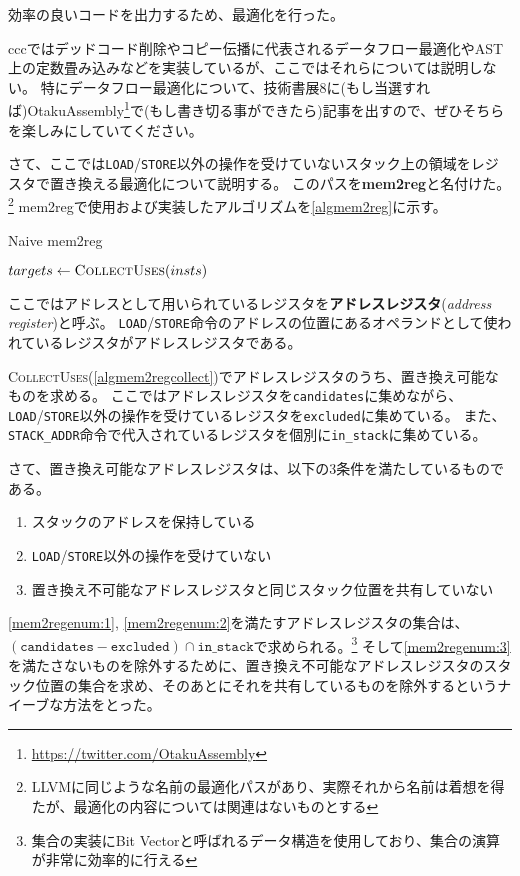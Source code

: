 \documentclass[../main.tex]{subfiles}
\begin{document}
効率の良いコードを出力するため、最適化を行った。

cccではデッドコード削除やコピー伝播に代表されるデータフロー最適化やAST上の定数畳み込みなどを実装しているが、ここではそれらについては説明しない。
特にデータフロー最適化について、技術書展8に(もし当選すれば)OtakuAssembly\footnote{\url{https://twitter.com/OtakuAssembly}}で(もし書き切る事ができたら)記事を出すので、ぜひそちらを楽しみにしていてください。

さて、ここでは\texttt{LOAD}/\texttt{STORE}以外の操作を受けていないスタック上の領域をレジスタで置き換える最適化について説明する。
このパスを\textbf{mem2reg}と名付けた。\footnote{LLVMに同じような名前の最適化パスがあり、実際それから名前は着想を得たが、最適化の内容については関連はないものとする}
mem2regで使用および実装したアルゴリズムを\cref{algmem2reg}に示す。

\begin{algorithm}[h]
\caption{Naive mem2reg}\label{algmem2reg}
\begin{algorithmic}[1]
  \State $targets \gets \Call{CollectUses}{insts}$
  \State {}
\EndProcedure
\end{algorithmic}
\end{algorithm}

ここではアドレスとして用いられているレジスタを\textbf{アドレスレジスタ}(\textit{address register})と呼ぶ。
\texttt{LOAD}/\texttt{STORE}命令のアドレスの位置にあるオペランドとして使われているレジスタがアドレスレジスタである。

\textsc{CollectUses}(\cref{algmem2regcollect})でアドレスレジスタのうち、置き換え可能なものを求める。
ここではアドレスレジスタを\texttt{candidates}に集めながら、\texttt{LOAD}/\texttt{STORE}以外の操作を受けているレジスタを\texttt{excluded}に集めている。
また、\texttt{STACK\_ADDR}命令で代入されているレジスタを個別に\texttt{in\_stack}に集めている。

さて、置き換え可能なアドレスレジスタは、以下の3条件を満たしているものである。
\begin{enumerate}
  \item \label{mem2regenum:1}スタックのアドレスを保持している
  \item \label{mem2regenum:2}\texttt{LOAD}/\texttt{STORE}以外の操作を受けていない
  \item \label{mem2regenum:3}置き換え不可能なアドレスレジスタと同じスタック位置を共有していない
\end{enumerate}
\cref{mem2regenum:1}, \cref{mem2regenum:2}を満たすアドレスレジスタの集合は、$(\texttt{candidates} - \texttt{excluded}) \cap {\texttt{in\_stack}}$で求められる。\footnote{集合の実装にBit Vectorと呼ばれるデータ構造を使用しており、集合の演算が非常に効率的に行える}
そして\cref{mem2regenum:3}を満たさないものを除外するために、置き換え不可能なアドレスレジスタのスタック位置の集合を求め、そのあとにそれを共有しているものを除外するというナイーブな方法をとった。
\end{document}
